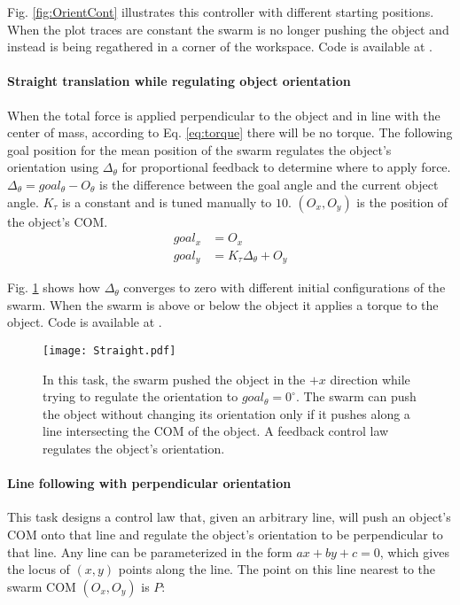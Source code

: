 Fig. \ref{fig:OrientCont} illustrates this controller with different starting positions. When the plot traces are constant the swarm is no longer pushing the object and instead is being regathered in a corner of the workspace. Code is available at \cite{Shahrokhi16Orient}.

\paragraph{Straight translation while regulating object orientation} \label{para:PureTranslation}

When the total force is applied perpendicular to the object and in line with the center of mass, according to Eq. \eqref{eq:torque} there will be no torque. 
The following goal position for the mean position of the swarm regulates the object's orientation using $\Delta_{\theta}$ for proportional feedback  to determine where to apply force.
$\Delta_\theta = goal_\theta - O_\theta$ is the difference between the goal angle and the current object angle.
 $K_\tau$ is a constant and is tuned manually to $10$. $(O_x,O_y)$ is the position of the object's COM.
\begin{align}
goal_x &= O_x \nonumber \\
goal_y &= K_\tau \Delta_{\theta} + O_y  \label{eq:TranslationAndOrientation}
\end{align}

 Fig. \ref{fig:Straight} shows how $\Delta_{\theta}$ converges to zero with different initial configurations of the swarm. When the swarm is above or below the object it applies a torque to the object. Code is available at \cite{Shahrokhi16translation}.
 
 
\begin{figure}
\begin{center}
	\texttt{[image: Straight.pdf]}
\end{center}
\vspace{-1em}
\caption{\label{fig:Straight}
In this task, the swarm pushed the object in the $+x$ direction while trying to regulate the orientation to $goal_{\theta} = 0^\circ$.
 The swarm can push the object without changing its orientation only if it pushes along a line intersecting the COM of the object.  A feedback control law regulates the object's orientation.
}
\vspace{-2em}
\end{figure}

\paragraph{Line following with perpendicular orientation} \label{para:PureTranslation}
This task designs a control law that, given an arbitrary line, will push an object's COM onto that line and regulate the object's orientation to be perpendicular to that line.
Any line can be parameterized in the form $ax+by+c =0$,  which gives the locus of $(x,y)$ points along the line.  The point on this line nearest to the swarm COM $(O_x,O_y)$ is $P$:

